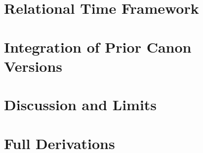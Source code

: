 \documentclass[11pt]{article}
\theoremstyle{definition}
\theoremstyle{plain}
\theoremstyle{remark}
\begin{document}
        

        
        

    \section{Relational Time Framework}
        \label{sec:time}
        
        

        
        

    \section{Integration of Prior Canon Versions}
        \label{sec:integration}
        
        

    \section{Discussion and Limits}
        \label{sec:discussion}
        
        

        
        \appendix
    
    \section{Full Derivations}
        \label{sec:appendix_derivations}
        
        
    
\end{document}
